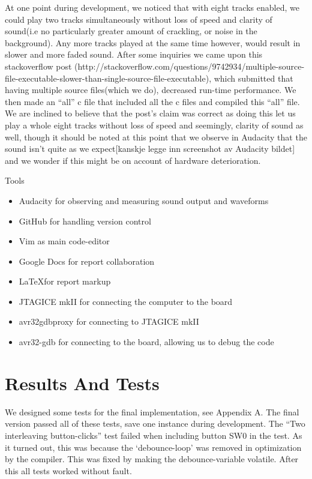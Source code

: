 \documentclass[a4paper,12pt]{article}
\begin{document}
At one point during development, we noticed that with eight tracks enabled, we could play two tracks simultaneously without loss of speed and clarity of sound(i.e no particularly greater amount of crackling, or noise in the background). Any more tracks played at the same time however, would result in slower and more faded sound.
	After some inquiries we came upon this stackoverflow post (http://stackoverflow.com/questions/9742934/multiple-source-file-executable-slower-than-single-source-file-executable), which submitted that having multiple source files(which we do), decreased run-time performance. We then made an “all” c file that included all the c files and compiled this “all” file. We are inclined to believe that the post’s claim was correct as doing this let us play a whole eight tracks without loss of speed and seemingly, clarity of sound as well, though it should be noted at this point that we observe in Audacity that the sound isn’t quite as we expect[kanskje legge inn screenshot av Audacity bildet] and we wonder if this might be on account of hardware deterioration.


Tools

\begin{itemize}
\item Audacity for observing and measuring sound output and waveforms
\item GitHub for handling version control
\item Vim as main code-editor
\item Google Docs for report collaboration
\item \LaTeX for report markup
\item JTAGICE mkII for connecting the computer to the board
\item avr32gdbproxy for connecting to JTAGICE mkII
\item avr32-gdb for connecting to the board, allowing us to debug the code
\end{itemize}

\clearpage
\section{Results And Tests}
We designed some tests for the final implementation, see Appendix A. The final version passed all of these tests, save one instance during development. The  “Two interleaving button-clicks” test failed when including button SW0 in the test. As it turned out, this was because the ‘debounce-loop’ was removed in optimization by the compiler. This was fixed by making the debounce-variable volatile. After this all tests worked without fault.
\end{document}
